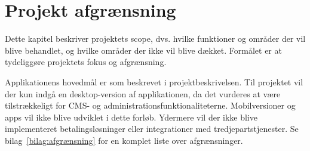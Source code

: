 \section{Projekt afgrænsning}
Dette kapitel beskriver projektets scope, dvs. hvilke funktioner og områder der vil blive behandlet, og hvilke områder
der ikke vil blive dækket.
Formålet er at tydeliggøre projektets fokus og afgrænsning.

Applikationens hovedmål er som beskrevet i projektbeskrivelsen.
Til projektet vil der kun indgå en desktop-version af applikationen, da det vurderes at være tilstrækkeligt
for CMS- og administrationsfunktionaliteterne.
Mobilversioner og apps vil ikke blive udviklet i dette forløb.
Ydermere vil der ikke blive implementeret betalingsløsninger eller integrationer med tredjepartstjenester.
Se bilag~\ref{bilag:afgrænsning} for en komplet liste over afgrænsninger.
